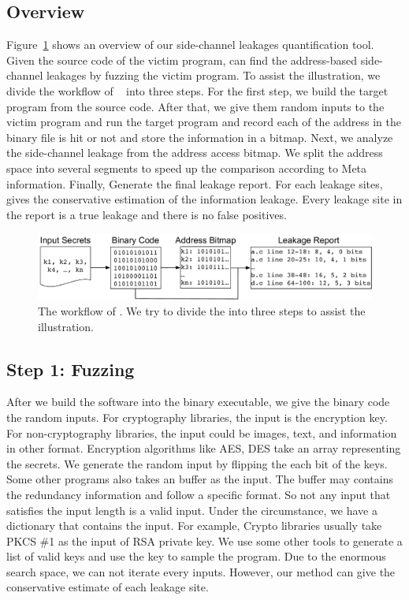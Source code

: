 \subsection{Overview}
Figure~\ref{chapter5:fig:workflow} shows an overview of our side-channel leakages quantification tool. Given the source code of the victim program, \ctool{} can find the address-based side-channel leakages by fuzzing the victim program. To assist the illustration, we divide the workflow of ~\ctool{} into three steps. For the first step, we build the target program from the source code. After that, we give them random inputs to the victim program and run the target program and record each of the address in the binary file is hit or not and store the information in a bitmap. Next, we analyze the side-channel leakage from the address access bitmap. We split the address space into several segments to speed up the comparison according to Meta information. Finally, \ctool{} Generate the final leakage report. For each leakage sites, \ctool{} gives the conservative estimation of the information leakage. Every leakage site in the report is a true leakage and there is no false positives.

\begin{figure}[ht]
  \centering
  \includegraphics[width=\columnwidth]{./figures/chapter5/workflow.pdf}
  \caption{The workflow of \ctool{}. We try to divide the \ctool{} into three steps to assist the illustration. }\label{chapter5:fig:workflow}
\end{figure}

\subsection{Step 1: Fuzzing}
After we build the software into the binary executable, we give the binary code the random inputs. For cryptography libraries, the input is the encryption key. For non-cryptography libraries, the input could be images, text, and information in other format. Encryption algorithms like AES, DES take an array representing the secrets. We generate the random input by flipping the each bit of the keys. Some other programs also takes an buffer as the input. The buffer may contains the redundancy information and follow a specific format. So not any input that satisfies the input length is a valid input. Under the circumstance, we have a dictionary that contains the input. For example, Crypto libraries usually take PKCS \#1 as the input of RSA private key. We use some other tools to generate a list of valid keys and use the key to sample the program. Due to the enormous search space, we can not iterate every inputs. However, our method can give the conservative  estimate of each leakage site.
